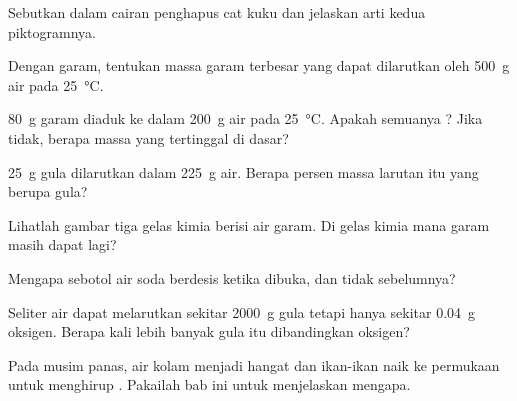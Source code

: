 \begin{exercise}[$\star$]\label{exo:g6:solutions-and-solubility:5}
Sebutkan  dalam cairan penghapus cat kuku dan jelaskan arti
kedua piktogramnya.
\end{exercise}

\begin{exercise}[$\star\star$]\label{exo:g6:solutions-and-solubility:6}
Dengan  garam, tentukan massa garam terbesar yang dapat
dilarutkan oleh \qty{500}{g} air pada \qty{25}{\celsius}.
\end{exercise}

\begin{exercise}[$\star\star$]\label{exo:g6:solutions-and-solubility:7}
\qty{80}{g} garam diaduk ke dalam \qty{200}{g} air pada
\qty{25}{\celsius}. Apakah semuanya ? Jika tidak, berapa massa
yang tertinggal di dasar?
\end{exercise}

\begin{exercise}[$\star\star$]\label{exo:g6:solutions-and-solubility:8}
\qty{25}{g} gula dilarutkan dalam \qty{225}{g} air. Berapa persen
massa larutan itu yang berupa gula?
\end{exercise}

\begin{exercise}[$\star\star$]\label{exo:g6:solutions-and-solubility:9}
Lihatlah gambar tiga gelas kimia berisi air garam. Di gelas kimia mana
garam masih dapat  lagi?
\end{exercise}

\begin{exercise}[$\star\star$]\label{exo:g6:solutions-and-solubility:10}
Mengapa sebotol air soda berdesis ketika dibuka, dan tidak sebelumnya?
\end{exercise}

\begin{exercise}[$\star\star\star$]\label{exo:g6:solutions-and-solubility:11}
Seliter air dapat melarutkan sekitar \qty{2000}{g} gula tetapi hanya
sekitar \qty{0.04}{g} oksigen. Berapa kali lebih banyak gula itu
dibandingkan oksigen?
\end{exercise}

\begin{exercise}[$\star\star\star$]\label{exo:g6:solutions-and-solubility:12}
Pada musim panas, air kolam menjadi hangat dan ikan-ikan naik ke
permukaan untuk menghirup . Pakailah bab ini untuk menjelaskan
mengapa.
\end{exercise}

